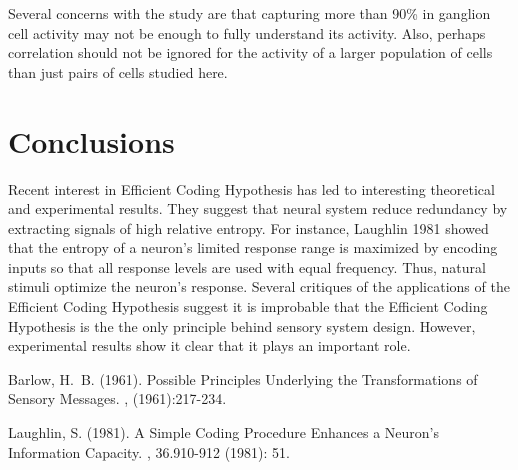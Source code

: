 \documentclass[twoside]{article}
\begin{document}
\begin{multicols}{2}
Several concerns with the study are that capturing more than 90\% in ganglion cell activity may not be enough to fully understand its activity. Also, perhaps correlation should not be ignored for the activity of a larger population of cells than just pairs of cells studied here. 




\section{Conclusions}

Recent interest in Efficient Coding Hypothesis has led to interesting theoretical and experimental results. They suggest that neural system reduce redundancy by extracting signals of high relative entropy. For instance, Laughlin 1981 showed that the entropy of a neuron’s limited response range is maximized by encoding inputs so that all response levels are used with equal frequency. Thus, natural stimuli optimize the neuron's response. Several critiques of the applications of the Efficient Coding Hypothesis suggest it is improbable that the Efficient Coding Hypothesis is the the only principle behind sensory system design. However, experimental results show it clear that it plays an important role.




\begin{thebibliography}{99} 

Barlow, H.~B. (1961).
\newblock Possible Principles Underlying the Transformations of Sensory Messages.
, (1961):217-234.

Laughlin, S. (1981).
\newblock A Simple Coding Procedure Enhances a Neuron's Information Capacity.
, 36.910-912 (1981): 51.


\end{thebibliography}
\end{multicols}
\end{document}
